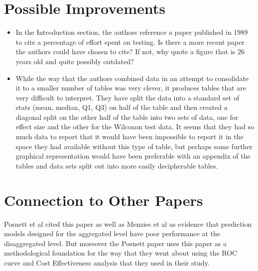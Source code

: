 \documentclass[english]{article}
\begin{document}
\section*{Possible Improvements}
\begin{itemize}
\item In the Introduction section, the authors reference a paper published
in 1989 to cite a percentage of effort spent on testing. Is there
a more recent paper the authors could have chosen to cite? If not,
why quote a figure that is 26 years old and quite possibly outdated?

\item While the way that the authors combined data in an attempt to consolidate it to a smaller number of tables was very clever, it produces tables that are very difficult to interpret.  They have split the data into a standard set of stats (mean, median, Q1, Q3) on half of the table and then created a diagonal split on the other half of the table into two sets of data, one for effect size and the other for the Wilcoxon test data.  It seems that they had so much data to report that it would have been impossible to report it in the space they had available without this type of table, but perhaps some further graphical representation would have been preferable with an appendix of the tables and data sets split out into more easily decipherable tables.

\end{itemize}

\section*{Connection to Other Papers}
Posnett et al \cite{posnett11} cited this paper as well as Menzies et al \cite{menzies10} as evidence that prediction models designed for the aggregated level have poor performance at the disaggregated level.  But moreover the Posnett paper uses this paper as a methodological foundation for the way that they went about using the ROC curve and Cost Effectiveness analysis that they used in their study.

{}

\end{document}
